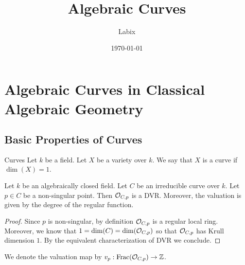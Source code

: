 \documentclass[a4paper]{article}
\title{Algebraic Curves}
\author{Labix}
\date{\today}
\begin{document}
\maketitle
\begin{abstract}
\end{abstract}
\pagebreak
\tableofcontents
\pagebreak

\section{Algebraic Curves in Classical Algebraic Geometry}
\subsection{Basic Properties of Curves}
\begin{defn}{Curves}{} Let $k$ be a field. Let $X$ be a variety over $k$. We say that $X$ is a curve if $\dim(X)=1$. 
\end{defn}

\begin{prp}{}{} Let $k$ be an algebraically closed field. Let $C$ be an irreducible curve over $k$. Let $p\in C$ be a non-singular point. Then $\mathcal{O}_{C,p}$ is a DVR. Moreover, the valuation is given by the degree of the regular function. \tcbline
\begin{proof}
Since $p$ is non-singular, by definition $\mathcal{O}_{C,p}$ is a regular local ring. Moreover, we know that $1=\dim(C)=\dim(\mathcal{O}_{C,p})$ so that $\mathcal{O}_{C,p}$ has Krull dimension $1$. By the equivalent characterization of DVR we conclude. 
\end{proof}
\end{prp}

We denote the valuation map by $v_p:\text{Frac}(\mathcal{O}_{C,p})\to\mathbb{Z}$. 
\end{document}
